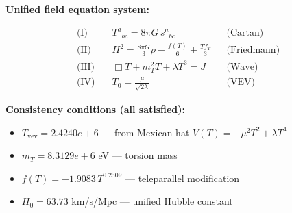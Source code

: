 
\textbf{Unified field equation system:}

\begin{align}
  \text{(I)} \quad & T^a{}_{bc} = 8\pi G \, s^a{}_{bc} && \text{(Cartan)} \\
  \text{(II)} \quad & H^2 = \frac{8\pi G}{3}\rho - \frac{f(T)}{6} + \frac{Tf_T}{3} && \text{(Friedmann)} \\
  \text{(III)} \quad & \Box T + m_T^2 T + \lambda T^3 = J && \text{(Wave)} \\
  \text{(IV)} \quad & T_0 = \frac{\mu}{\sqrt{2\lambda}} && \text{(VEV)}
\end{align}

\textbf{Consistency conditions (all satisfied):}
\begin{itemize}
  \item $T_{\text{vev}} = 2.4240e+6$ — from Mexican hat $V(T) = -\mu^2 T^2 + \lambda T^4$
  \item $m_T = 8.3129e+6$ eV — torsion mass
  \item $f(T) = -1.9083 \, T^{0.2509}$ — teleparallel modification
  \item $H_0 = 63.73$ km/s/Mpc — unified Hubble constant
\end{itemize}
